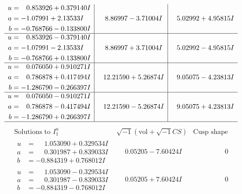 \documentclass[1p]{elsarticle_modified}
\theoremstyle{definition}
\newcommand{\I}{\sqrt{-1}}
\begin{document}
$$\begin{array}{c|c|c}
\begin{aligned}
u &= \phantom{-}0.853926 + 0.379140 I \\
a &= -1.07991 + 2.13533 I \\
b &= -0.768766 - 0.133800 I\end{aligned}
 & \phantom{-}8.86997 - 3.71004 I & \phantom{-}5.02992 + 4.95815 I \\ \hline\begin{aligned}
u &= \phantom{-}0.853926 - 0.379140 I \\
a &= -1.07991 - 2.13533 I \\
b &= -0.768766 + 0.133800 I\end{aligned}
 & \phantom{-}8.86997 + 3.71004 I & \phantom{-}5.02992 - 4.95815 I \\ \hline\begin{aligned}
u &= \phantom{-}0.076050 + 0.910271 I \\
a &= \phantom{-}0.786878 + 0.417494 I \\
b &= -1.286790 - 0.266397 I\end{aligned}
 & \phantom{-}12.21590 + 5.26874 I & \phantom{-}9.05075 - 4.23813 I \\ \hline\begin{aligned}
u &= \phantom{-}0.076050 - 0.910271 I \\
a &= \phantom{-}0.786878 - 0.417494 I \\
b &= -1.286790 + 0.266397 I\end{aligned}
 & \phantom{-}12.21590 - 5.26874 I & \phantom{-}9.05075 + 4.23813 I\\
 \hline 
 \end{array}$$\newpage$$\begin{array}{c|c|c}  
\text{Solutions to }I^u_{1}& \I (\text{vol} + \sqrt{-1}CS) & \text{Cusp shape}\\
 \hline 
\begin{aligned}
u &= \phantom{-}1.053090 + 0.329534 I \\
a &= \phantom{-}0.301987 + 0.839033 I \\
b &= -0.884319 + 0.768012 I\end{aligned}
 & \phantom{-}0.05205 - 7.60424 I & \phantom{-0.000000 } 0 \\ \hline\begin{aligned}
u &= \phantom{-}1.053090 - 0.329534 I \\
a &= \phantom{-}0.301987 - 0.839033 I \\
b &= -0.884319 - 0.768012 I\end{aligned}
 & \phantom{-}0.05205 + 7.60424 I & \phantom{-0.000000 } 0 \\ \hline\begin{aligned}

\end{aligned}
\end{array}$$
\end{document}
